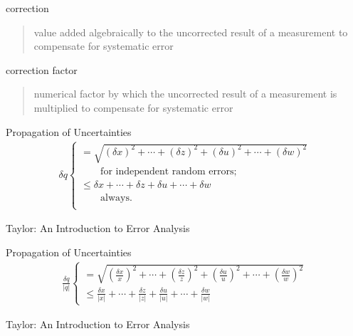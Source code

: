 \documentclass[avery5371,grid]{flashcards}
\begin{document}
\begin{flashcard}[Defintion]{correction}
\hfill\vfill
\begin{quote}
    value added algebraically to the uncorrected result of a measurement to compensate for systematic error
\end{quote}
\vfill
\end{flashcard}

\begin{flashcard}[Defintion]{correction factor}
\hfill\vfill
\begin{quote}
    numerical factor by which the uncorrected result of a measurement is multiplied to compensate for systematic error
\end{quote}
\vfill
\end{flashcard}


\begin{flashcard}[Definition]{Propagation of Uncertainties}
\hfill
\vfill
\begin{align*}
    \delta q
    \begin{cases}
        = \sqrt{ \left(\delta x\right)^2 + \cdots + \left(\delta z\right)^2 + \left(\delta u\right)^2 + \cdots + \left(\delta w\right)^2 } \\
            \quad\quad\text{for independent random errors;} \\
        \leq \delta x + \cdots + \delta z + \delta u + \cdots + \delta w \\
            \quad\quad\text{always.} \\
    \end{cases}
\end{align*}
\vfill
\begin{flushright}
    \footnotesize Taylor: An Introduction to Error Analysis
\end{flushright}
\end{flashcard}

\begin{flashcard}[Definition]{Propagation of Uncertainties}
\hfill
\vfill
\begin{align*}
    \frac{\delta q}{|q|}
    \begin{cases}
        = \sqrt{ \left(\frac{\delta x}{x}\right)^2 + \cdots + \left(\frac{\delta z}{z}\right)^2 + \left(\frac{\delta u}{u}\right)^2 + \cdots + \left(\frac{\delta w}{w}\right)^2 } \\
        \leq \frac{\delta x}{|x|} + \cdots + \frac{\delta z}{|z|} + \frac{\delta u}{|u|} + \cdots + \frac{\delta w}{|w|}
    \end{cases}
\end{align*}
\vfill
\begin{flushright}
    \footnotesize Taylor: An Introduction to Error Analysis
\end{flushright}
\end{flashcard}
\end{document}
